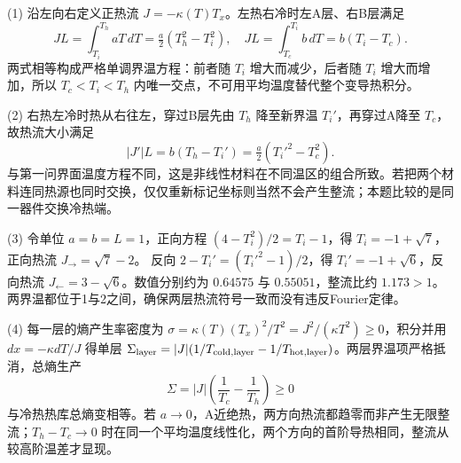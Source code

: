 (1) 沿左向右定义正热流 \(J=-\kappa(T)T_x\)。左热右冷时左A层、右B层满足
\[
JL=\int_{T_i}^{T_h}aT\,dT=\tfrac a2(T_h^2-T_i^2),
\quad JL=\int_{T_c}^{T_i}b\,dT=b(T_i-T_c).
\]
两式相等构成严格单调界温方程：前者随 \(T_i\) 增大而减少，后者随 \(T_i\) 增大而增加，所以 \(T_c<T_i<T_h\) 内唯一交点，不可用平均温度替代整个变导热积分。

(2) 右热左冷时热从右往左，穿过B层先由 \(T_h\) 降至新界温 \(T_i'\)，再穿过A降至 \(T_c\)，故热流大小满足
\[
|J'|L=b(T_h-T_i')=\tfrac a2(T_i'^2-T_c^2).
\]
与第一问界面温度方程不同，这是非线性材料在不同温区的组合所致。若把两个材料连同热源也同时交换，仅仅重新标记坐标则当然不会产生整流；本题比较的是同一器件交换冷热端。

(3) 令单位 \(a=b=L=1\)，正向方程 \((4-T_i^2)/2=T_i-1\)，得 \(T_i=-1+\sqrt7\)，正向热流 \(\boxed{J_{\rightarrow}=\sqrt7-2}\)。
反向 \(2-T_i'=(T_i'^2-1)/2\)，得 \(T_i'=-1+\sqrt6\)，反向热流 \(\boxed{J_{\leftarrow}=3-\sqrt6}\)。数值分别约为 \(0.64575\) 与 \(0.55051\)，整流比约 \(1.173>1\)。两界温都位于1与2之间，确保两层热流符号一致而没有违反Fourier定律。

(4) 每一层的熵产生率密度为 \(\sigma=\kappa(T)(T_x)^2/T^2=J^2/(\kappa T^2)\ge0\)，积分并用 \(dx=-\kappa dT/J\) 得单层 \(\Sigma_{\rm layer}=|J|(1/T_{\rm cold,layer}-1/T_{\rm hot,layer})\)。两层界温项严格抵消，总熵生产
\[
\boxed{\Sigma=|J|\left(\frac1{T_c}-\frac1{T_h}\right)\ge0}
\]
与冷热热库总熵变相等。若 \(a\to0\)，A近绝热，两方向热流都趋零而非产生无限整流；\(T_h-T_c\to0\) 时在同一个平均温度线性化，两个方向的首阶导热相同，整流从较高阶温差才显现。
